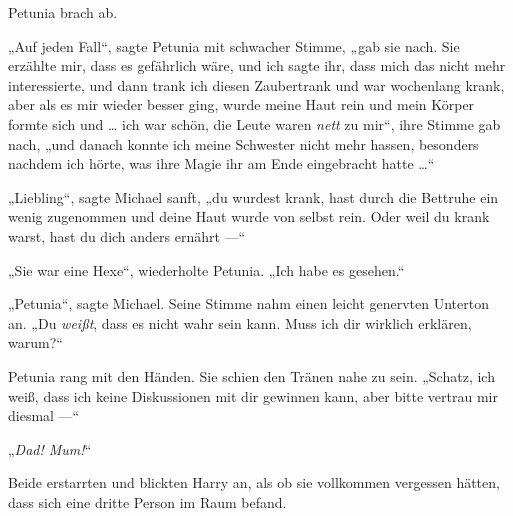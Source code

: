 Petunia brach ab.

„Auf jeden Fall“, sagte Petunia mit schwacher Stimme, „gab sie nach. Sie erzählte mir, dass es gefährlich wäre, und ich sagte ihr, dass mich das nicht mehr interessierte, und dann trank ich diesen Zaubertrank und war wochenlang krank, aber als es mir wieder besser ging, wurde meine Haut rein und mein Körper formte sich und … ich war schön, die Leute waren \emph{nett} zu mir“, ihre Stimme gab nach, „und danach konnte ich meine Schwester nicht mehr hassen, besonders nachdem ich hörte, was ihre Magie ihr am Ende eingebracht hatte …“

„Liebling“, sagte Michael sanft, „du wurdest krank, hast durch die Bettruhe ein wenig zugenommen und deine Haut wurde von selbst rein. Oder weil du krank warst, hast du dich anders ernährt —“

„Sie war eine Hexe“, wiederholte Petunia.
„Ich habe es gesehen.“

„Petunia“, sagte Michael. Seine Stimme nahm einen leicht genervten Unterton an.
„Du \emph{weißt}, dass es nicht wahr sein kann. Muss ich dir wirklich erklären, warum?“

Petunia rang mit den Händen. Sie schien den Tränen nahe zu sein.
„Schatz, ich weiß, dass ich keine Diskussionen mit dir gewinnen kann, aber bitte vertrau mir diesmal —“

„\emph{Dad! Mum!}“

Beide erstarrten und blickten Harry an, als ob sie vollkommen vergessen hätten, dass sich eine dritte Person im Raum befand.

